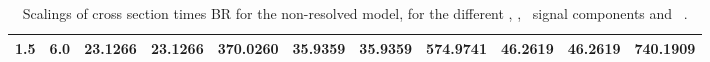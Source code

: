 \begin{landscape}
\begin{table}[h!]
\begin{tabular}{ll rrr rrr rrr}
   1.5 & 6.0    & 23.1266 & 23.1266 & 370.0260   & 35.9359 & 35.9359 & 574.9741   & 46.2619 & 46.2619 & 740.1909 \\\hline
    \end{tabular}                                                                                                                                                                          
    \caption[Scalings of $\sigma\times$BR for the signal components and \ ]{Scalings of cross section times BR for the non-resolved model, for the different \ttH, \tHq, \tHW\ signal components and \ .}\label{tab:xsbrscalingK6_1p5}                              
 \end{table}   

\end{landscape}







